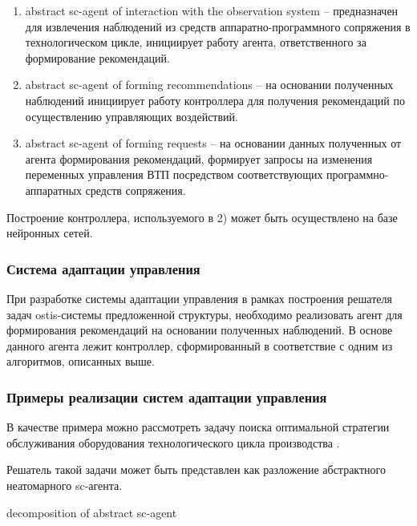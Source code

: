 \begin{enumerate}
    \item abstract sc-agent of interaction with the observation system – предназначен для извлечения наблюдений из средств аппаратно-программного сопряжения в технологическом цикле, инициирует работу агента, ответственного за формирование рекомендаций.
    \item abstract sc-agent of forming recommendations – на основании полученных наблюдений инициирует работу контроллера для получения рекомендаций по осуществлению управляющих воздействий.
    \item abstract sc-agent of forming requests – на основании данных полученных от агента формирования рекомендаций, формирует запросы на  изменения переменных управления ВТП посредством соответствующих программно-аппаратных средств сопряжения.

\end{enumerate}

Построение контроллера, используемого в 2) может быть осуществлено на базе нейронных сетей.



\subsubsection{Система адаптации управления}

При разработке  системы адаптации управления в рамках построения решателя задач ostis-системы предложенной структуры, необходимо реализовать агент для формирования рекомендаций на основании полученных наблюдений. В основе данного агента лежит контроллер, сформированный в соответствие с одним из алгоритмов, описанных выше.



\subsubsection{Примеры реализации систем адаптации управления}

В качестве примера можно рассмотреть задачу поиска оптимальной стратегии обслуживания оборудования технологического цикла производства .

Решатель такой задачи может быть представлен как разложение абстрактного неатомарного sc-агента.

\begin{SCn}
\begin{scnrelfromset}{decomposition of abstract sc-agent}
\end{scnrelfromset}
\end{SCn}


